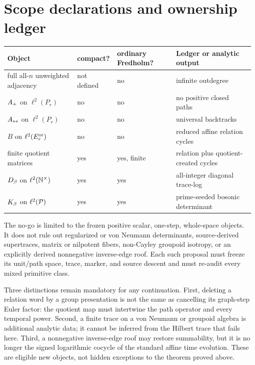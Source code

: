 \section{Scope declarations and ownership ledger}
\label{app:scope}

\begin{table}[htbp]
\centering
\small
\begin{tabularx}{\textwidth}{@{}Y L{0.16\textwidth}L{0.16\textwidth}Y@{}}
\toprule
Object & compact? & ordinary Fredholm? & Ledger or analytic output \\
\midrule
full all-$n$ unweighted adjacency & not defined & no & infinite outdegree \\
$A_{+}$ on $\ell^2(P_r)$ & no & no & no positive closed paths \\
$A_{\leftrightarrow}$ on $\ell^2(P_r)$ & no & no & universal backtracks \\
$B$ on $\ell^2(E_r^{\mathrm{or}})$ & no & no & reduced affine relation cycles \\
finite quotient matrices & yes & yes, finite & relation plus quotient-created cycles \\
$D_{\beta}$ on $\ell^2(\mathbb N^\times)$ & yes & yes & all-integer diagonal trace-log \\
$K_{\beta}$ on $\ell^2(\mathcal P)$ & yes & yes & prime-seeded bosonic determinant \\
\bottomrule
\end{tabularx}
\end{table}

The no-go is limited to the frozen positive scalar, one-step, whole-space
objects.  It does not rule out regularized or von Neumann determinants,
source-derived supertraces, matrix or nilpotent fibers, non-Cayley groupoid
isotropy, or an explicitly derived nonnegative inverse-edge roof.  Each such
proposal must freeze its unit/path space, trace, marker, and source descent
and must re-audit every mixed primitive class.

Three distinctions remain mandatory for any continuation.  First, deleting a
relation word by a group presentation is not the same as cancelling its
graph-step Euler factor: the quotient map must intertwine the path operator
and every temporal power.  Second, a finite trace on a von Neumann or groupoid
algebra is additional analytic data; it cannot be inferred from the Hilbert
trace that fails here.  Third, a nonnegative inverse-edge roof may restore
summability, but it is no longer the signed logarithmic cocycle of the
standard affine time evolution.  These are eligible new objects, not hidden
exceptions to the theorem proved above.

